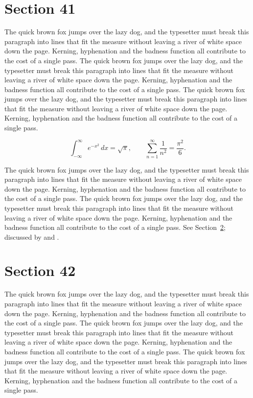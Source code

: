 \documentclass{article}
\begin{document}
\section{Section 41}
\label{sec:41}
The quick brown fox jumps over the lazy dog, and the typesetter must break this paragraph into lines that fit the measure without leaving a river of white space down the page. Kerning, hyphenation and the badness function all contribute to the cost of a single pass. The quick brown fox jumps over the lazy dog, and the typesetter must break this paragraph into lines that fit the measure without leaving a river of white space down the page. Kerning, hyphenation and the badness function all contribute to the cost of a single pass. The quick brown fox jumps over the lazy dog, and the typesetter must break this paragraph into lines that fit the measure without leaving a river of white space down the page. Kerning, hyphenation and the badness function all contribute to the cost of a single pass. 

\begin{equation}\label{eq:41}
\int_{-\infty}^{\infty} e^{-x^{2}}\,dx = \sqrt{\pi}, \qquad
\sum_{n=1}^{\infty} \frac{1}{n^{2}} = \frac{\pi^{2}}{6}.
\end{equation}

The quick brown fox jumps over the lazy dog, and the typesetter must break this paragraph into lines that fit the measure without leaving a river of white space down the page. Kerning, hyphenation and the badness function all contribute to the cost of a single pass. The quick brown fox jumps over the lazy dog, and the typesetter must break this paragraph into lines that fit the measure without leaving a river of white space down the page. Kerning, hyphenation and the badness function all contribute to the cost of a single pass. 
See Section~\ref{sec:42}; discussed by \textcite{k2} and \textcite{l4}.
\section{Section 42}
\label{sec:42}
The quick brown fox jumps over the lazy dog, and the typesetter must break this paragraph into lines that fit the measure without leaving a river of white space down the page. Kerning, hyphenation and the badness function all contribute to the cost of a single pass. The quick brown fox jumps over the lazy dog, and the typesetter must break this paragraph into lines that fit the measure without leaving a river of white space down the page. Kerning, hyphenation and the badness function all contribute to the cost of a single pass. The quick brown fox jumps over the lazy dog, and the typesetter must break this paragraph into lines that fit the measure without leaving a river of white space down the page. Kerning, hyphenation and the badness function all contribute to the cost of a single pass. 
\end{document}
